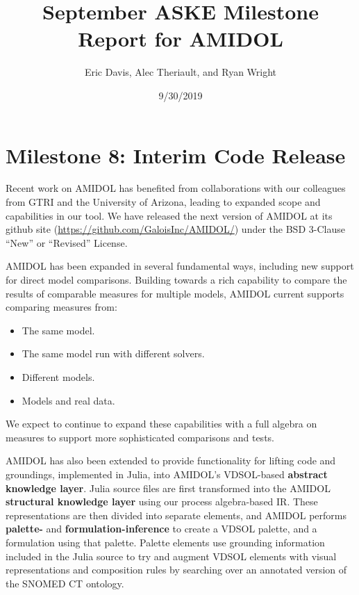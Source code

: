 \documentclass[12pt]{galois-whitepaper}
\author{Eric Davis, Alec Theriault, and Ryan Wright}
\title{September ASKE Milestone Report for AMIDOL}
\date{9/30/2019}
\begin{document}
\maketitle

\vspace*{2cm}
\tableofcontents

\section{Milestone 8: Interim Code Release}

Recent work on AMIDOL has benefited from collaborations with our
colleagues from GTRI and the University of Arizona, leading to
expanded scope and capabilities in our tool.  We have released the
next version of AMIDOL at its github site
(\url{https://github.com/GaloisInc/AMIDOL/}) under the BSD 3-Clause
``New'' or ``Revised'' License.

AMIDOL has been expanded in several
fundamental ways, including new support for direct model comparisons.
Building towards a rich capability to compare the results of
comparable measures for multiple models, AMIDOL current supports
comparing measures from:

\begin{itemize}
\item The same model.
\item The same model run with different solvers.
\item Different models.
\item Models and real data.
\end{itemize}

We expect to continue to expand these capabilities with a full algebra
on measures to support more sophisticated comparisons and tests.

AMIDOL has also been extended to provide functionality for lifting
code and groundings, implemented in Julia, into AMIDOL's VDSOL-based
\textbf{abstract knowledge layer}.  Julia source files are first
transformed into the AMIDOL \textbf{structural knowledge layer} using
our process algebra-based IR.  These representations are then divided
into separate elements, and AMIDOL performs \textbf{palette-} and
\textbf{formulation-inference} to create a VDSOL palette, and a
formulation using that palette.  Palette elements use grounding
information included in the Julia source to try and augment VDSOL
elements with visual representations and composition rules by
searching over an annotated version of the SNOMED CT ontology.
\end{document}
